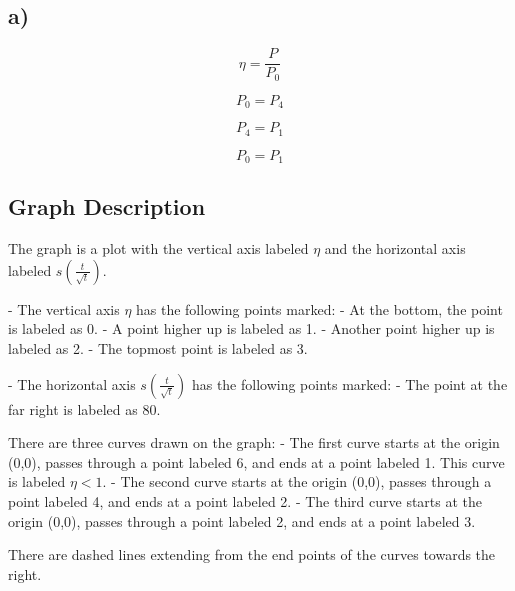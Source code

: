 

\subsection*{a)}

\[
\eta = \frac{P}{P_0}
\]

\[
P_0 = P_4
\]

\[
P_4 = P_1
\]

\[
P_0 = P_1
\]

\subsection*{Graph Description}

The graph is a plot with the vertical axis labeled $\eta$ and the horizontal axis labeled $s \left( \frac{t}{\sqrt{t}} \right)$. 

- The vertical axis $\eta$ has the following points marked:
  - At the bottom, the point is labeled as 0.
  - A point higher up is labeled as 1.
  - Another point higher up is labeled as 2.
  - The topmost point is labeled as 3.

- The horizontal axis $s \left( \frac{t}{\sqrt{t}} \right)$ has the following points marked:
  - The point at the far right is labeled as 80.

There are three curves drawn on the graph:
- The first curve starts at the origin (0,0), passes through a point labeled 6, and ends at a point labeled 1. This curve is labeled $\eta < 1$.
- The second curve starts at the origin (0,0), passes through a point labeled 4, and ends at a point labeled 2.
- The third curve starts at the origin (0,0), passes through a point labeled 2, and ends at a point labeled 3.

There are dashed lines extending from the end points of the curves towards the right.
